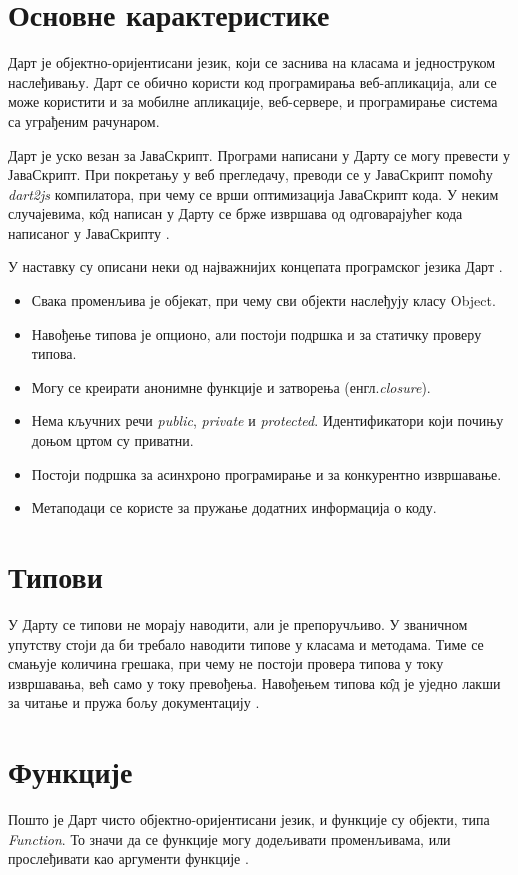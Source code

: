 \documentclass[12pt,oneside]{memoir}
\begin{document}
\section{Основне карактеристике}
\label{dart-karakteristike}
Дарт је објектно-оријентисани језик, који се заснива на класама и једноструком наслеђивању. Дарт се обично користи код програмирања веб-апликација, али се може користити и за мобилне апликације, веб-сервере, и програмирање система са уграђеним рачунаром.

Дарт је уско везан за ЈаваСкрипт. Програми написани у Дарту се могу превести у ЈаваСкрипт. При покретању у веб прегледачу, преводи се у ЈаваСкрипт помоћу \textit{dart2js} компилатора, при чему се врши оптимизација ЈаваСкрипт кода. У неким случајевима, к\^{о}д написан у Дарту се брже извршава од одговарајућег кода написаног у ЈаваСкрипту \cite{dart, dart1}.

У наставку су описани неки од најважнијих концепата програмског језика Дарт \cite{dart, dart1}.
\begin{itemize}
\item Свака променљива је објекат, при чему сви објекти наслеђују класу Object.
\item Навођење типова је опционо, али постоји подршка и за статичку проверу типова.
\item Могу се креирати анонимне функције и затворења (енгл.\textit{closure}).
\item Нема кључних речи \textit{public}, \textit{private} и \textit{protected}. Идентификатори који почињу доњом цртом су приватни.
\item Постоји подршка за асинхроно програмирање и за конкурентно извршавање.
\item Метаподаци се користе за пружање додатних информација о коду.
\end{itemize}

\section{Типови}
\label{tipovi}

У Дарту се типови не морају наводити, али је препоручљиво. У званичном упутству стоји да би требало наводити типове у класама и методама. Тиме се смањује количина грешака, при чему не постоји провера типова у току извршавања, већ само у току превођења. Навођењем типова к\^{о}д је уједно лакши за читање и пружа бољу документацију \cite{dart, dart1}. 

\section{Функције}
\label{funkcije}
Пошто је Дарт чисто објектно-оријентисани језик, и функције су објекти, типа \textit{Function}. То значи да се функције могу додељивати променљивама, или прослеђивати као аргументи функције \cite{dart, dart1}.
\end{document}
